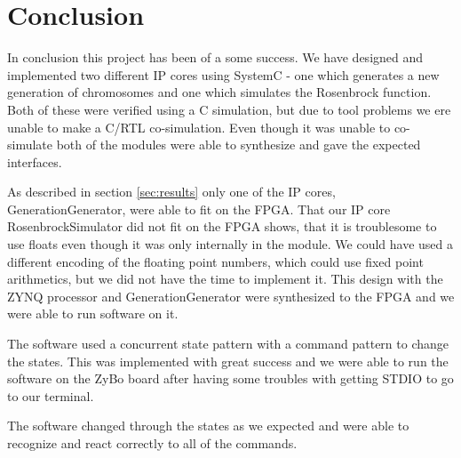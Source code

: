 \section{Conclusion}
In conclusion this project has been of a some success. We have designed and implemented two different IP cores using SystemC - one which generates a new generation of chromosomes and one which simulates the Rosenbrock function. Both of these were verified using a C simulation, but due to tool problems we ere unable to make a C/RTL co-simulation. Even though it was unable to co-simulate both of the modules were able to synthesize and gave the expected interfaces. 

As described in section \ref{sec:results} only one of the IP cores, GenerationGenerator, were able to fit on the FPGA. That our IP core RosenbrockSimulator did not fit on the FPGA shows, that it is troublesome to use floats even though it was only internally in the module. We could have used a different encoding of the floating point numbers, which could use fixed point arithmetics, but we did not have the time to implement it.
This design with the ZYNQ processor and GenerationGenerator were synthesized to the FPGA and we were able to run software on it.

The software used a concurrent state pattern with a command pattern to change the states. This was implemented with great success and we were able to run the software on the ZyBo board after having some troubles with getting STDIO to go to our terminal.

The software changed through the states as we expected and were able to recognize and react correctly to all of the commands.



